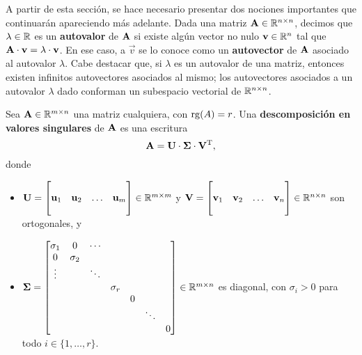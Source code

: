 A partir de esta sección, se hace necesario presentar dos nociones importantes
que continuarán apareciendo más adelante.
Dada una matriz $\mathbf{A} \in \mathbb{R}^{n \times n}$, decimos que $\lambda \in
\mathbb{R}$ es un \textbf{autovalor} de $\mathbf{A}$ si existe algún vector no nulo
$\mathbf{v} \in \mathbb{R}^n$ tal que $\mathbf{A} \cdot \mathbf{v} =
\lambda \cdot \mathbf{v}$.
En ese caso, a $\vec{v}$ se lo conoce como un \textbf{autovector} de $\mathbf{A}$
asociado al autovalor $\lambda$. Cabe destacar que, si $\lambda$ es un
autovalor de una matriz, entonces existen infinitos autovectores asociados al
mismo; los autovectores asociados a un autovalor $\lambda$ dado conforman un
subespacio vectorial de $\mathbb{R}^{n \times n}$.

Sea $\mathbf{A} \in \mathbb{R}^{m \times n}$ una matriz cualquiera, con $\operatorname{rg}(A) = r$.
Una \textbf{descomposición en valores singulares} de $\mathbf{A}$
es una escritura
\[ \mathbf{A} = \mathbf{U} \cdot \mathbf{\Sigma} \cdot \mathbf{V}^{\mathrm{T}}, \]
donde
\begin{itemize} \vspace{.6em}
\item $\mathbf{U} = \begin{bmatrix}
                  &           &        &           \\
        \mathbf{u}_1 & \mathbf{u}_2 & \dots  & \mathbf{u}_m \\
                  &           &        &           \\
    \end{bmatrix} \in \mathbb{R}^{m \times m}$ y
    $\mathbf{V} = \begin{bmatrix}
                  &           &        &           \\
        \mathbf{v}_1 & \mathbf{v}_2 & \dots  & \mathbf{v}_n \\
                  &           &        &           \\
    \end{bmatrix} \in \mathbb{R}^{n \times n}$ son ortogonales, y \vspace{.6em}
\item $\mathbf{\Sigma} = \begin{bmatrix}
\sigma_1 & 0        & \cdots   &    &          &          &          \\
0        & \sigma_2 &          &          &          &          &          \\
\vdots   &          & \ddots   &          &          &          &          \\
         &          &          & \sigma_r &          &          &          \\
         &          &          &          & 0        &          &          \\
         &          &          &          &          & \ddots   &          \\
         &          &          &          &          &          & 0
\end{bmatrix} \in \mathbb{R}^{m \times n}$ es diagonal,
    con $\sigma_i > 0$ para todo $i \in \{ 1, \dots, r \}$.
\end{itemize} \vspace{.6em}

